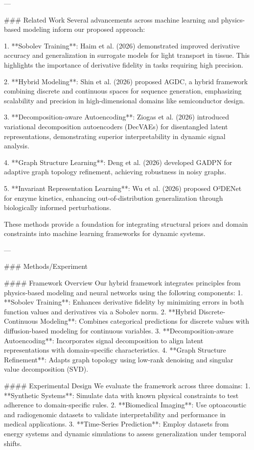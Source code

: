 ---

### Related Work  
Several advancements across machine learning and physics-based modeling inform our proposed approach:  

1. **Sobolev Training**: Haim et al. (2026) demonstrated improved derivative accuracy and generalization in surrogate models for light transport in tissue. This highlights the importance of derivative fidelity in tasks requiring high precision.  

2. **Hybrid Modeling**: Shin et al. (2026) proposed AGDC, a hybrid framework combining discrete and continuous spaces for sequence generation, emphasizing scalability and precision in high-dimensional domains like semiconductor design.  

3. **Decomposition-aware Autoencoding**: Ziogas et al. (2026) introduced variational decomposition autoencoders (DecVAEs) for disentangled latent representations, demonstrating superior interpretability in dynamic signal analysis.  

4. **Graph Structure Learning**: Deng et al. (2026) developed GADPN for adaptive graph topology refinement, achieving robustness in noisy graphs.  

5. **Invariant Representation Learning**: Wu et al. (2026) proposed O²DENet for enzyme kinetics, enhancing out-of-distribution generalization through biologically informed perturbations.  

These methods provide a foundation for integrating structural priors and domain constraints into machine learning frameworks for dynamic systems.  

---

### Methods/Experiment  

#### Framework Overview  
Our hybrid framework integrates principles from physics-based modeling and neural networks using the following components:  
1. **Sobolev Training**: Enhances derivative fidelity by minimizing errors in both function values and derivatives via a Sobolev norm.  
2. **Hybrid Discrete-Continuous Modeling**: Combines categorical predictions for discrete values with diffusion-based modeling for continuous variables.  
3. **Decomposition-aware Autoencoding**: Incorporates signal decomposition to align latent representations with domain-specific characteristics.  
4. **Graph Structure Refinement**: Adapts graph topology using low-rank denoising and singular value decomposition (SVD).  

#### Experimental Design  
We evaluate the framework across three domains:  
1. **Synthetic Systems**: Simulate data with known physical constraints to test adherence to domain-specific rules.  
2. **Biomedical Imaging**: Use optoacoustic and radiogenomic datasets to validate interpretability and performance in medical applications.  
3. **Time-Series Prediction**: Employ datasets from energy systems and dynamic simulations to assess generalization under temporal shifts.  

